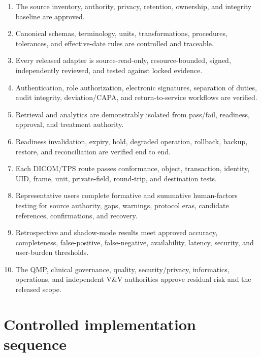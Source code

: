 \documentclass[11pt,letterpaper]{article}
\begin{document}
\begin{enumerate}
\item The source inventory, authority, privacy, retention, ownership, and integrity baseline are approved.
\item Canonical schemas, terminology, units, transformations, procedures, tolerances, and effective-date rules are controlled and traceable.
\item Every released adapter is source-read-only, resource-bounded, signed, independently reviewed, and tested against locked evidence.
\item Authentication, role authorization, electronic signatures, separation of duties, audit integrity, deviation/CAPA, and return-to-service workflows are verified.
\item Retrieval and analytics are demonstrably isolated from pass/fail, readiness, approval, and treatment authority.
\item Readiness invalidation, expiry, hold, degraded operation, rollback, backup, restore, and reconciliation are verified end to end.
\item Each DICOM/TPS route passes conformance, object, transaction, identity, UID, frame, unit, private-field, round-trip, and destination tests.
\item Representative users complete formative and summative human-factors testing for source authority, gaps, warnings, protocol eras, candidate references, confirmations, and recovery.
\item Retrospective and shadow-mode results meet approved accuracy, completeness, false-positive, false-negative, availability, latency, security, and user-burden thresholds.
\item The QMP, clinical governance, quality, security/privacy, informatics, operations, and independent V\&V authorities approve residual risk and the released scope.
\end{enumerate}

\section{Controlled implementation sequence}
\end{document}
